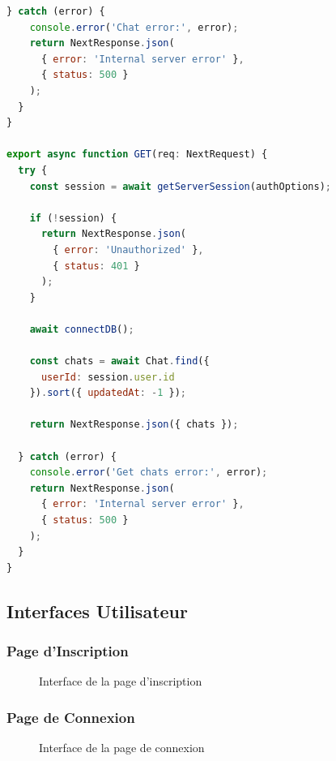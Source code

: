 \begin{lstlisting}[language=JavaScript, caption=API Route pour le chat, label=code:api-chat]
  } catch (error) {
    console.error('Chat error:', error);
    return NextResponse.json(
      { error: 'Internal server error' },
      { status: 500 }
    );
  }
}

export async function GET(req: NextRequest) {
  try {
    const session = await getServerSession(authOptions);
    
    if (!session) {
      return NextResponse.json(
        { error: 'Unauthorized' },
        { status: 401 }
      );
    }
    
    await connectDB();
    
    const chats = await Chat.find({ 
      userId: session.user.id 
    }).sort({ updatedAt: -1 });
    
    return NextResponse.json({ chats });
    
  } catch (error) {
    console.error('Get chats error:', error);
    return NextResponse.json(
      { error: 'Internal server error' },
      { status: 500 }
    );
  }
}
\end{lstlisting}

\subsection{Interfaces Utilisateur}

\subsubsection{Page d'Inscription}

\begin{figure}[H]
    \centering
    \caption{Interface de la page d'inscription}
    \label{fig:ui-register}
\end{figure}

\subsubsection{Page de Connexion}

\begin{figure}[H]
    \centering
    \caption{Interface de la page de connexion}
    \label{fig:ui-login}
\end{figure}

